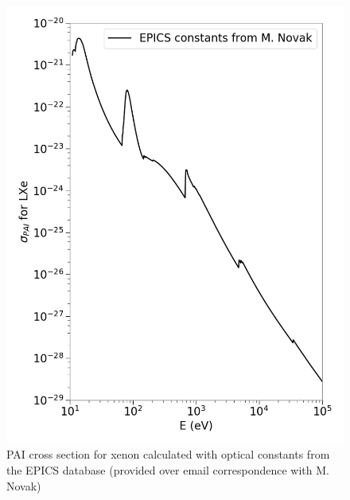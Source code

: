 \begin{figure}[htbp]
\begin{center}
\includegraphics[width=\textwidth]{figures/app/full_fvp_xe_epics.png}
\caption{\acs{PAI} cross section for xenon calculated with optical constants from the EPICS database (provided over email correspondence with M. Novak) }
\label{fig:full_fvp_epics}
\end{center}
\end{figure}

